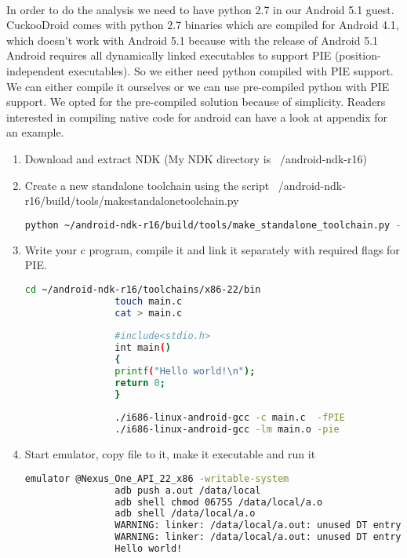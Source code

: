 \documentclass[../main.tex]{subfile}
\begin{document}
		\paragraph{} In order to do the analysis we need to have python 2.7 in our Android 5.1 guest. CuckooDroid comes with python 2.7 binaries which are compiled for Android 4.1, which doesn't work with Android 5.1 because with the release of Android 5.1 Android requires all dynamically linked executables to support PIE (position-independent executables). So we either need python compiled with PIE support. We can either compile it ourselves or we can use pre-compiled python with PIE support. We opted for the pre-compiled solution because of simplicity. Readers interested in compiling native code for android can have a look at appendix for an example.  
		\begin{enumerate}
				\item Download and extract NDK (My NDK directory is ~/android-ndk-r16)
				\item Create a new standalone toolchain using the script ~/android-ndk-r16/build/tools/make\textunderscore standalone\textunderscore toolchain.py
				\begin{lstlisting}[language=bash]
				python ~/android-ndk-r16/build/tools/make_standalone_toolchain.py --arch x86 --api 22 --install-dir ~/android-ndk-r16/toolchains/x86-22
				\end{lstlisting}
				\item Write your c program, compile it and link it separately with required flags for PIE.
				\begin{lstlisting}[language=bash]
				cd ~/android-ndk-r16/toolchains/x86-22/bin
				touch main.c
				cat > main.c
				
				#include<stdio.h>
				int main()
				{
				printf("Hello world!\n");
				return 0;
				}
				
				./i686-linux-android-gcc -c main.c  -fPIE
				./i686-linux-android-gcc -lm main.o -pie
				\end{lstlisting}
				\item Start emulator, copy file to it, make it executable and run it
				\begin{lstlisting}[language=bash]
				emulator @Nexus_One_API_22_x86 -writable-system
				adb push a.out /data/local
				adb shell chmod 06755 /data/local/a.o
				adb shell /data/local/a.o
				WARNING: linker: /data/local/a.out: unused DT entry: type 0x6ffffffe arg 0x32c
				WARNING: linker: /data/local/a.out: unused DT entry: type 0x6fffffff arg 0x1
				Hello world!
				\end{lstlisting}
		\end{enumerate}
		
\end{document}
